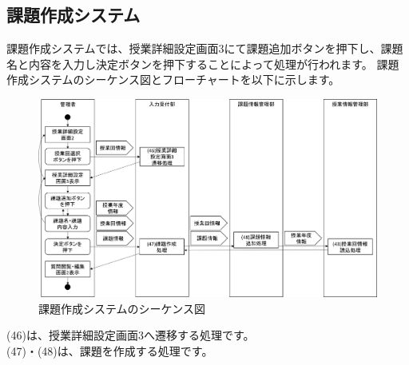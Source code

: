 \clearpage



\subsection{課題作成システム}
課題作成システムでは、授業詳細設定画面3にて課題追加ボタンを押下し、課題名と内容を入力し決定ボタンを押下することによって処理が行われます。
課題作成システムのシーケンス図とフローチャートを以下に示します。

\begin{figure}[htbp]
  \begin{center}
    \includegraphics[width=1\linewidth,clip]{./img/seq12.png}
    \caption{課題作成システムのシーケンス図}\label{fig:seq12}
  \end{center}
\end{figure}

(46)は、授業詳細設定画面3へ遷移する処理です。\\
(47)・(48)は、課題を作成する処理です。

